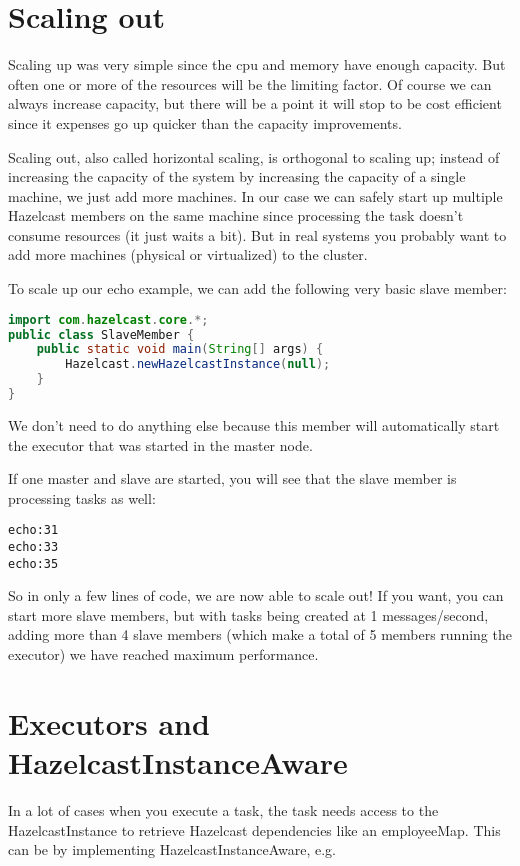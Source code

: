 \section{Scaling out}
Scaling up was very simple since the cpu and memory have enough capacity. But often one or more of the resources will be the limiting factor. Of course we can always increase capacity, but there will be a point it will stop to be cost efficient since it expenses go up quicker than the capacity improvements.

Scaling out, also called horizontal scaling, is orthogonal to scaling up; instead of increasing the capacity of the system by increasing the capacity of a single machine, we just add more machines. In our case we can safely start up multiple Hazelcast members on the same machine since processing the task doesn't consume resources (it just waits a bit). But in real systems you probably want to add more machines (physical or virtualized) to the cluster.

To scale up our echo example, we can add the following very basic slave member:
\begin{lstlisting}[language=java]
import com.hazelcast.core.*;
public class SlaveMember {
    public static void main(String[] args) {
        Hazelcast.newHazelcastInstance(null);
    }
}
\end{lstlisting}
We don't need to do anything else because this member will automatically start the executor that was started in the master node.

If one master and slave are started, you will see that the slave member is processing tasks as well:
\begin{lstlisting}
echo:31
echo:33
echo:35	
\end{lstlisting}
So in only a few lines of code, we are now able to scale out! If you want, you can start more slave members, but with tasks being created at 1 messages/second, adding more than 4 slave members (which make a total of 5 members running the executor) we have reached maximum performance. 

\section{Executors and HazelcastInstanceAware}
In a lot of cases when you execute a task, the task needs access to the HazelcastInstance to retrieve Hazelcast dependencies like an employeeMap. This can be by implementing HazelcastInstanceAware, e.g.

